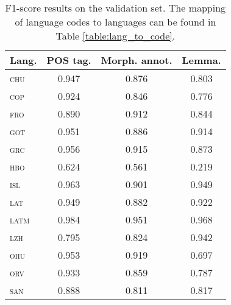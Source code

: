 \documentclass{../acl_latex.tex}
\begin{document}
\begin{table}[t]
\centering
\begin{tabular}{lccc}
\toprule
Lang.            & POS tag. & Morph. annot. & Lemma. \\ \midrule
\textsc{chu}     &  0.947   &  0.876        & 0.803  \\ 
\textsc{cop}     &  0.924   &  0.846        & 0.776  \\ 
\textsc{fro}     &  0.890   &  0.912        & 0.844  \\
\textsc{got}     &  0.951   &  0.886        & 0.914  \\
\textsc{grc}     &  0.956   &  0.915        & 0.873  \\
\textsc{hbo}     &  0.624   &  0.561        & 0.219  \\
\textsc{isl}     &  0.963   &  0.901        & 0.949  \\
\textsc{lat}     &  0.949   &  0.882        & 0.922  \\
\textsc{latm}    &  0.984   &  0.951        & 0.968  \\
\textsc{lzh}     &  0.795   &  0.824        & 0.942  \\
\textsc{ohu}     &  0.953   &  0.919        & 0.697  \\
\textsc{orv}     &  0.933   &  0.859        & 0.787  \\
\textsc{san}     &  0.888   &  0.811        & 0.817  \\ \bottomrule 
\end{tabular}
\caption{
    F1-score results on the validation set.
    The mapping of language codes to languages can be found in Table \ref{table:lang_to_code}.
}
\label{table:validation_results}
\end{table}
\end{document}
